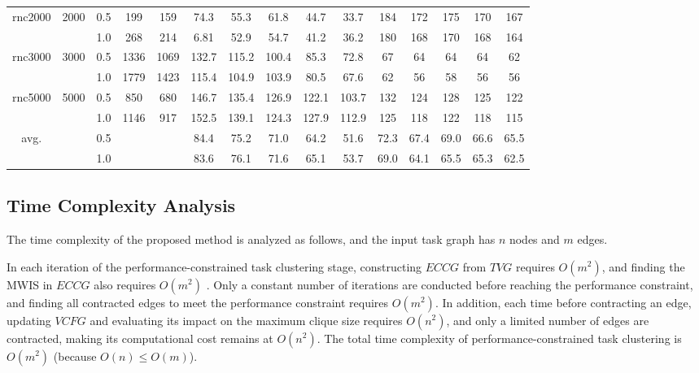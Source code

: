 \documentclass[10pt,journal, compsoc]{IEEEtran}
\begin{document}
\begin{table}[!t]
\begin{tabular}{c|c|c|c|c|ccccc|ccccc}
\hline
\multicolumn{1}{c|}{\multirow{2}{*}{rnc2000}}  &\multicolumn{1}{c|}{\multirow{2}{*}{2000}}   &0.5 &199  &159     &74.3   &55.3 &61.8 &44.7  &33.7       &184 &172  &175  &170  &167          \\
                                               &   &1.0 &268  &214     &6.81   &52.9 &54.7 &41.2  &36.2       &180 &168  &170  &168  &164         \\

\hline
\multicolumn{1}{c|}{\multirow{2}{*}{rnc3000}}   &\multicolumn{1}{c|}{\multirow{2}{*}{3000}}  &0.5 &1336  &1069    &132.7   &115.2 &100.4 &85.3  &72.8       &67  &64 &64  &64  &62          \\
                                                &  &1.0 &1779  &1423    &115.4   &104.9 &103.9 &80.5  &67.6       &62  &56 &58  &56  &56          \\
\hline

\multicolumn{1}{c|}{\multirow{2}{*}{rnc5000}}    &\multicolumn{1}{c|}{\multirow{2}{*}{5000}}   &0.5 &850  &680    &146.7  &135.4  &126.9  &122.1  &103.7       &132 &124  &128 &125  &122          \\
                                                 &   &1.0 &1146 &917    &152.5   &139.1 &124.3  &127.9  &112.9       &125 &118  &122 &118  &115         \\

\hline
\multicolumn{1}{c|}{\multirow{2}{*}{avg.}}    &   &0.5   &  &    &84.4      &75.2    &71.0  &64.2     &51.6    &72.3 &67.4 &69.0  &66.6 &65.5       \\
                                              &   &1.0   &  &    &83.6      &76.1    &71.6  &65.1     &53.7    &69.0 &64.1 &65.5  &65.3 &62.5 \\
\hline
\hline
\end{tabular}
\label{table:PCTS}
\end{table}








\subsection{Time Complexity Analysis}

The time complexity of the proposed method is analyzed as follows, and the input task graph has $n$ nodes and $m$ edges.

In each iteration of the performance-constrained task clustering stage, constructing $ECCG$ from $TVG$ requires $O(m^2)$, and finding the MWIS in $ECCG$ also requires $O(m^2)$ \cite{conference:LC}. Only a constant number of iterations are conducted before reaching the performance constraint, and finding all contracted edges to meet the performance constraint requires $O(m^2)$. In addition, each time before contracting an edge, updating $VCFG$ and evaluating its impact on the maximum clique size requires $O(n^2)$, and only a limited number of edges are contracted, making its computational cost remains at $O(n^2)$. The total time complexity of performance-constrained task clustering is $O(m^2)$ (because $O(n)\leq O(m)$).
\end{document}
